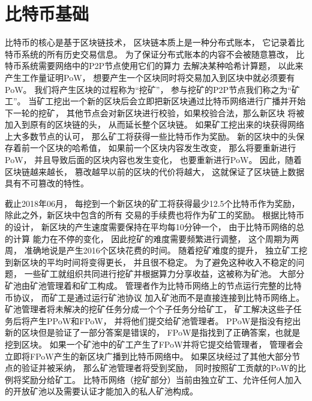 \documentclass[a4paper, 11pt]{article}
\begin{document}
\begin{CJK*}{UTF8}{gbsn}
\begin{itemize}
    \end{itemize}

    \section{比特币基础}

    \indent
    
    比特币的核心是基于区块链技术，
    区块链本质上是一种分布式账本，
    它记录着比特币系统的所有历史交易信息。
    为了保证分布式账本的内容不会被随意篡改，
    比特币系统需要网络中的P2P节点使用它们的算力
    去解决某种哈希计算题，
    以此来产生工作量证明PoW，
    想要产生一个区块同时将交易加入到区块中就必须要有PoW。
    我们将产生区块的过程称为“挖矿”，
    参与挖矿的P2P节点我们称之为“矿工”。
    当矿工挖出一个新的区块后会立即把新区块通过比特币网络进行广播并开始下一轮的挖矿，
    其他节点会对新区块进行校验，如果校验合法，那么新区块
    将被加入到原有的区块链的头，
    从而延长整个区块链。
    如果矿工挖出来的块获得网络上大多数节点的认可，
    那么矿工将获得一些比特币作为奖励。
    新的区块中的头保存着前一个区块的哈希值，
    如果前一个区块内容发生改变，
    那么将要重新进行PoW，
    并且导致后面的区块内容也发生变化，
    也要重新进行PoW。
    因此，随着区块链越来越长，
    篡改越早以前的区块的代价将越大，
    这就保证了区块链上数据具有不可篡改的特性。


    截止2018年06月，
    每挖到一个新区块的矿工将获得最少12.5个比特币作为奖励，
    除此之外，新区块中包含的所有
    交易的手续费也将作为矿工的奖励。
    根据比特币的设计，
    新区块的产生速度需要保持在平均每10分钟一个，
    由于比特币网络的总的计算
    能力在不停的变化，
    因此挖矿的难度需要频繁进行调整，
    这个周期为两周，
    准确地说是产生2016个区块花费的时间。
    随着挖矿难度的提升，
    独立矿工挖到新区块的平均时间将变得更长，
    并且很不稳定。
    为了避免这种收入不稳定的问题，
    一些矿工就组织共同进行挖矿并根据算力分享收益，这被称为矿池。
    大部分矿池由矿池管理着和矿工构成。
    管理者作为比特币网络上的节点运行完整的比特币协议，
    而矿工是通过运行矿池协议\cite{ref_web2}
    加入矿池而不是直接连接到比特币网络上。
    矿池管理者将未解决的挖矿任务分成一个个子任务分给矿工，
    矿工解决这些子任务后将产生PPoW和FPoW，
    并将他们提交给矿池管理者。
    PPoW是指没有挖出新的区块但是验证了一部分答案是错误的，
    FPoW是指找到了正确答案，也就是挖到区块。
    如果一个矿池中的矿工产生了FPoW并将它提交给管理者，
    管理者会立即将FPoW产生的新区块广播到比特币网络中。
    如果区块经过了其他大部分节点的验证并被采纳，
    那么矿池管理者将受到奖励，
    同时按照矿工贡献的PoW的比例将奖励分给矿工。
    比特币网络（挖矿部分）当前由独立矿工、允许任何人加入的开放矿池以及需要认证才能加入的私人矿池构成。


\end{CJK*}
\end{document}
